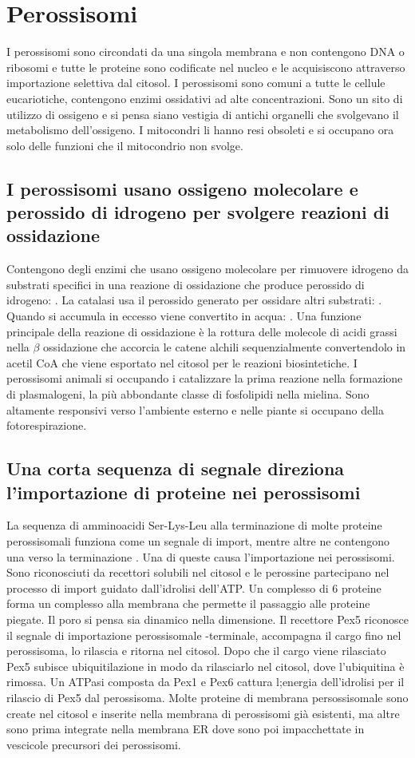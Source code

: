 \section{Perossisomi}
I perossisomi sono circondati da una singola membrana e non contengono DNA o ribosomi e tutte le proteine sono codificate nel nucleo e le acquisiscono attraverso importazione selettiva
dal citosol. I perossisomi sono comuni a tutte le cellule eucariotiche, contengono enzimi ossidativi ad alte concentrazioni. Sono un sito di utilizzo di ossigeno e si pensa siano
vestigia di antichi organelli che svolgevano il metabolismo dell'ossigeno. I mitocondri li hanno resi obsoleti e si occupano ora solo delle funzioni che il mitocondrio non svolge.
\subsection{I perossisomi usano ossigeno molecolare e perossido di idrogeno per svolgere reazioni di ossidazione}
Contengono degli enzimi che usano ossigeno molecolare per rimuovere idrogeno da substrati specifici in una reazione di ossidazione che produce perossido di idrogeno: . La catalasi usa il perossido generato per ossidare altri substrati: . Quando  si accumula in eccesso viene convertito in acqua:
. Una funzione principale della reazione di ossidazione \`e la rottura delle molecole di acidi grassi nella $\beta$ ossidazione che accorcia le catene alchili
sequenzialmente convertendolo in acetil CoA che viene esportato nel citosol per le reazioni biosintetiche. I perossisomi animali si occupando i catalizzare la prima reazione nella 
formazione di plasmalogeni, la pi\`u abbondante classe di fosfolipidi nella mielina. Sono altamente responsivi verso l'ambiente esterno e nelle piante si occupano della 
fotorespirazione. 
\subsection{Una corta sequenza di segnale direziona l'importazione di proteine nei perossisomi}
La sequenza di amminoacidi Ser-Lys-Leu alla terminazione  di molte proteine perossisomali funziona come un segnale di import, mentre altre ne contengono una verso la terminazione
. Una di queste causa l'importazione nei perossisomi. Sono riconosciuti da recettori solubili nel citosol e le perossine partecipano nel processo di import guidato dall'idrolisi
dell'ATP. Un complesso di $6$ proteine forma un complesso alla membrana che permette il passaggio alle proteine piegate. Il poro si pensa sia dinamico nella dimensione. Il recettore 
Pex5 riconosce il segnale di importazione perossisomale -terminale, accompagna il cargo fino nel perossisoma, lo rilascia e ritorna nel citosol. Dopo che il cargo viene rilasciato
Pex5 subisce ubiquitilazione in modo da rilasciarlo nel citosol, dove l'ubiquitina \`e rimossa. Un ATPasi composta da Pex1 e Pex6 cattura l;energia dell'idrolisi per il rilascio di Pex5
dal perossisoma. Molte proteine di membrana persossisomale sono create nel citosol e inserite nella membrana di perossisomi gi\`a esistenti, ma altre sono prima integrate nella membrana
ER dove sono poi impacchettate in vescicole precursori dei perossisomi. 
